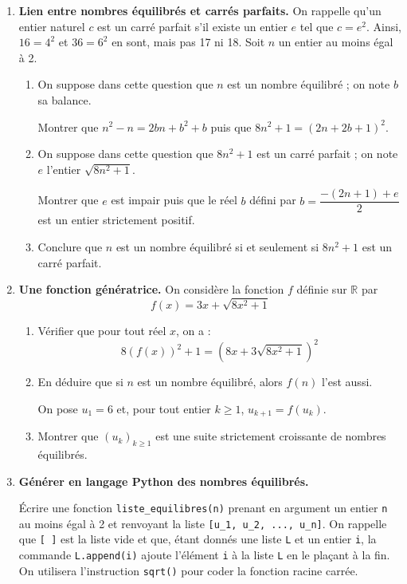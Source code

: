 \begin{enumerate}
\item \textbf{Lien entre nombres équilibrés et carrés parfaits.} On rappelle qu'un entier naturel \( c \) est un carré parfait s'il existe un entier \( e \) tel que \( c = e^2 \). Ainsi, \( 16 = 4^2 \) et \( 36 = 6^2 \) en sont, mais pas 17 ni 18. Soit \( n \) un entier au moins égal à 2.
\begin{enumerate}
    \item On suppose dans cette question que \( n \) est un nombre équilibré ; on note \( b \) sa balance.
    
    Montrer que \( n^2 - n = 2bn + b^2 + b \) puis que \( 8n^2 + 1 = (2n + 2b + 1)^2 \).
    
    \item On suppose dans cette question que \( 8n^2 + 1 \) est un carré parfait ; on note \( e \) l'entier \( \sqrt{8n^2 + 1} \).
    
    Montrer que \( e \) est impair puis que le réel \( b \) défini par \( b = \dfrac{-(2n+1) + e}{2} \) est un entier strictement positif.
    
    \item Conclure que \( n \) est un nombre équilibré si et seulement si \( 8n^2 + 1 \) est un carré parfait.
\end{enumerate}

\item \textbf{Une fonction génératrice.} On considère la fonction \( f \) définie sur \( \mathbb{R} \) par  
\[f(x) = 3x + \sqrt{8x^2 + 1}\]

\begin{enumerate}
    \item Vérifier que pour tout réel \( x \), on a :  
    \[8(f(x))^2 + 1 = (8x + 3\sqrt{8x^2 + 1})^2\]
    
    \item En déduire que si \( n \) est un nombre équilibré, alors \( f(n) \) l'est aussi.
    
    On pose \( u_1 = 6 \) et, pour tout entier \( k \geqslant 1 \), \( u_{k+1} = f(u_k) \).
    
    \item Montrer que \( (u_k)_{k \geqslant 1} \) est une suite strictement croissante de nombres équilibrés.
\end{enumerate}

\item \textbf{Générer en langage Python des nombres équilibrés.} 

Écrire une fonction \texttt{liste\_equilibres(n)} prenant en argument un entier \texttt{n} au moins égal à 2 et renvoyant la liste \texttt{[u\_1, u\_2, ..., u\_n]}. On rappelle que \texttt{[ ]} est la liste vide et que, étant donnés une liste \texttt{L} et un entier \texttt{i}, la commande \texttt{L.append(i)} ajoute l'élément \texttt{i} à la liste \texttt{L} en le plaçant à la fin. On utilisera l'instruction \texttt{sqrt()} pour coder la fonction racine carrée.

\end{enumerate}
